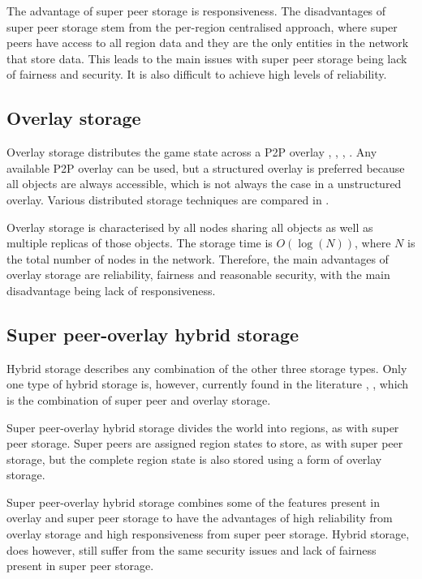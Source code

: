 \documentclass[10pt,a4paper,conference]{IEEEtran}
\begin{document}
The advantage of super peer storage is responsiveness. The disadvantages of super peer storage stem from the per-region centralised approach, where
super peers have access to all region data and they are the only entities in the network that store data. This leads to the main issues with super
peer storage being lack of fairness and security. It is also difficult to achieve high levels of reliability.

\subsection{Overlay storage}

Overlay storage distributes the game state across a P2P overlay \cite{Douglas05enablingmassively}, \cite{using_freenet_storage}, \cite{Fan_phd},
\cite{past_storage_focus}. Any available P2P overlay can be used, but a structured overlay is preferred because all objects are always accessible,
which is not always the case in a unstructured overlay. Various distributed storage techniques are compared in
\cite{Hasan_distributed_storage_survey}.

Overlay storage is characterised by all nodes sharing all objects as well as multiple replicas of those objects. The storage time is $O(\log(N))$,
where $N$ is the total number of nodes in the network. Therefore, the main advantages of overlay storage are reliability, fairness and reasonable
security, with the main disadvantage being lack of responsiveness.

\subsection{Super peer-overlay hybrid storage}

Hybrid storage describes any combination of the other three storage types. Only one type of hybrid storage is, however, currently found in the
literature \cite{zoned_federation}, \cite{hybrid_storage1}, which is the combination of super peer and overlay storage.

Super peer-overlay hybrid storage divides the world into regions, as with super peer storage. Super peers are assigned region states to store, as
with super peer storage, but the complete region state is also stored using a form of overlay storage.

Super peer-overlay hybrid storage combines some of the features present in overlay and super peer storage to have the advantages of high reliability
from overlay storage and high responsiveness from super peer storage. Hybrid storage, does however, still suffer from the same security issues and
lack of fairness present in super peer storage.
\end{document}
